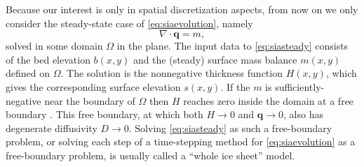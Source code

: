 \documentclass[twocolumn]{igs}
\newcommand\bq{\mathbf{q}}
\newcommand{\Div}{\nabla\cdot}
\begin{document}
Because our interest is only in spatial discretization aspects, from now on we only consider the steady-state case of \eqref{eq:siaevolution}, namely
\begin{equation}
\Div \bq = m,  \label{eq:siasteady}
\end{equation}
solved in some domain $\Omega$ in the plane.  The input data to \eqref{eq:siasteady} consists of the bed elevation $b(x,y)$ and the (steady) surface mass balance $m(x,y)$ defined on $\Omega$.  The solution is the nonnegative thickness function $H(x,y)$, which gives the corresponding surface elevation $s(x,y)$.  If the $m$ is sufficiently-negative near the boundary of $\Omega$ then $H$ reaches zero inside the domain at a free boundary \cite{JouvetBueler2012}.  This free boundary, at which both $H\to 0$ and $\bq \to 0$, also has degenerate diffusivity $D \to 0$.  Solving \eqref{eq:siasteady} as such a free-boundary problem, or solving each step of a time-stepping method for \eqref{eq:siaevolution} as a free-boundary problem, is usually called a ``whole ice sheet'' model.
\end{document}

